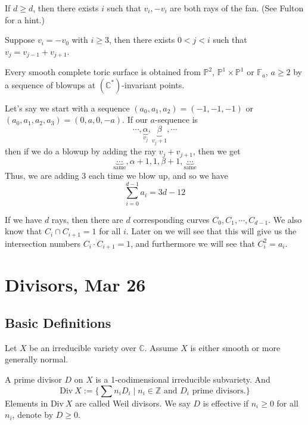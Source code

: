 \documentclass[a4paper,12pt]{amsart}
\newcommand{\ZZ}{\mathbb{Z}}
\newcommand{\CC}{\mathbb{C}}
\newcommand{\PP}{\mathbb{P}}
\begin{document}
\begin{exercise}
	If $d\geq d$, then there exists $i$ such that $v_i,-v_i$ are both rays of the fan. (See Fulton for a hint.)
\end{exercise}

\begin{exercise}
	Suppose $v_i=-v_0$ with $i\geq 3$, then there exists $0<j<i$ such that $v_j=v_{j-1}+v_{j+1}$.
\end{exercise}

\begin{theorem}
	Every smooth complete toric surface is obtained from $\PP^2$, $\PP^1\times\PP^1$ or $\mathbb{F}_a$, $a\geq 2$ by a sequence of blowups at $(\CC^*)$-invariant points.
\end{theorem}

\begin{remark}
	Let's say we start with a sequence $(a_0,a_1,a_2)=(-1,-1,-1)$ or $(a_0,a_1,a_2,a_3)=(0,a,0,-a)$. If our $a$-sequence is
	$$\cdots,\underbrace{\alpha}_{v_j},\underbrace{\beta}_{v_j+1},\cdots$$
	then if we do a blowup by adding the ray $v_j+v_{j+1}$, then we get
	$$\underbrace{\cdots}_\text{same},\alpha+1,1,\beta+1,\underbrace{\cdots}_\text{same}$$
	Thus, we are adding 3 each time we blow up, and so we have
	$$\sum_{i=0}^{d-1}a_i=3d-12$$
\end{remark}

\begin{remark}
	If we have $d$ rays, then there are $d$ corresponding curves $C_0,C_1,\cdots,C_{d-1}$. We also know that $C_i\cap C_{i+1}=1$ for all $i$. Later on we will see that this will give us the intersection numbers $C_i\cdot C_{i+1}=1$, and furthermore we will see that $C_i^2=a_i$.
\end{remark}

\newpage
\section{Divisors, Mar 26}

\subsection{Basic Definitions}

Let $X$ be an irreducible variety over $\CC$. Assume $X$ is either smooth or more generally normal.

\begin{definition}
	A prime divisor $D$ on $X$ is a 1-codimensional irreducible subvariety. And
	\begin{displaymath}
	\mathrm{Div}~X:=\{\sum n_iD_i\mid n_i\in\ZZ\text{ and }D_i\text{ prime divisors.}\}
	\end{displaymath}
	Elements in $\mathrm{Div}~X$ are called Weil divisors. We say $D$ is effective if $n_i\geq0$ for all $n_i$, denote by $D\geq0$.
\end{definition}
\end{document}
